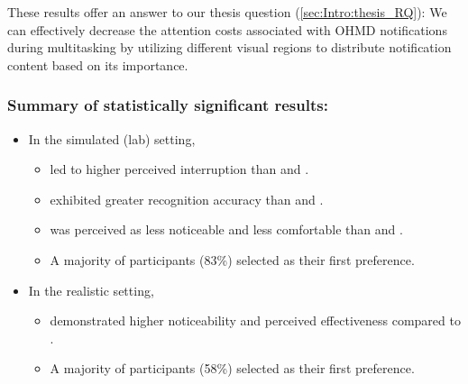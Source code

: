 These results offer an answer to our thesis question (\autoref{sec:Intro:thesis_RQ}): We can effectively decrease the attention costs associated with OHMD notifications during multitasking by utilizing different visual regions to distribute notification content based on its importance.

\subsubsection*{Summary of statistically significant results:}
{\small
\begin{itemize}
    \item In the simulated (lab) setting, 
    \begin{itemize}
        \item \Textbar{} led to higher perceived interruption than \linearbar{} and \circularbar{}.
        \item \Circularbar{} exhibited greater recognition accuracy than \linearbar{} and \textbar{}.
        \item \Textbar{} was perceived as less noticeable and less comfortable than \linearbar{} and \circularbar{}.
         \item A majority of participants (83\%) selected \circularbar{} as their first preference.
    \end{itemize}
    \item In the realistic setting, 
    \begin{itemize}
        \item \Circularbar{} demonstrated higher noticeability and perceived effectiveness compared to \linearbar{}.
        \item A majority of participants (58\%) selected \circularbar{} as their first preference.
    \end{itemize}
\end{itemize}
}





